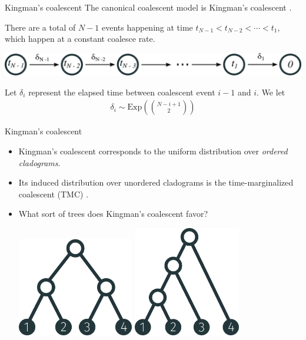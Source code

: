 \documentclass[10pt, compress]{beamer}
\begin{document}
\begin{frame}{Kingman's coalescent}
  The canonical coalescent model is \alert{Kingman's coalescent} \cite{Kingman1982}.

  There are a total of
  $N - 1$ events happening at time $t_{N - 1} < t_{N - 2} < \cdots < t_1$,
  which happen at a constant coalesce rate.

  \pause

  \begin{center}
    \includegraphics[width=\textwidth]{img/coalescent-times}
  \end{center}

  \pause


    Let $\delta_i$ represent the elapsed time
  between coalescent event $i-1$ and $i$.
  We let
  \begin{align}
    \delta_i \sim \mathrm{Exp}\left(\binom{N - i + 1}{2}\right)
  \end{align}

\end{frame}

\begin{frame}{Kingman's coalescent}
  \begin{itemize}
    \item<1-> Kingman's coalescent corresponds
  to the uniform distribution
  over \emph{ordered cladograms}.

    \item<2-> Its induced distribution over
  unordered cladograms is the time-marginalized coalescent (TMC) \cite{Boyles2012}.

    \item<3-> What sort of trees does Kingman's coalescent favor?
      \begin{center}
        \includegraphics[width=0.4\textwidth]{img/tree-1234-balanced} \hspace{0.4em}
        \includegraphics[width=0.37\textwidth]{img/tree-4-unbalanced}
      \end{center}
  \end{itemize}
\end{frame}
\end{document}
